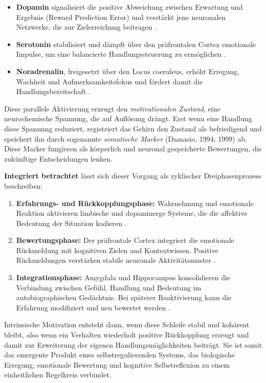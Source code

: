 \begin{itemize}
\item \textbf{Dopamin} signalisiert die positive Abweichung zwischen Erwartung und Ergebnis (Reward Prediction Error) und verstärkt jene neuronalen Netzwerke, die zur Zielerreichung beitragen \cite{Schultz1997}.
\item \textbf{Serotonin} stabilisiert und dämpft über den präfrontalen Cortex emotionale Impulse, um eine balancierte Handlungssteuerung zu ermöglichen \cite{CarverScheier1998, Cools2008}.
\item \textbf{Noradrenalin}, freigesetzt über den Locus coeruleus, erhöht Erregung, Wachheit und Aufmerksamkeitsfokus und fördert damit die Handlungsbereitschaft \cite{AstonJones2005}.
\end{itemize}

Diese parallele Aktivierung erzeugt den \emph{motivationalen Zustand}, eine neurochemische Spannung, die auf Auflösung drängt. Erst wenn eine Handlung diese Spannung reduziert, registriert das Gehirn den Zustand als befriedigend und speichert ihn durch sogenannte \emph{somatische Marker} (Damasio, 1994; 1999) ab. Diese Marker fungieren als körperlich und neuronal gespeicherte Bewertungen, die zukünftige Entscheidungen lenken.

\textbf{Integriert betrachtet} lässt sich dieser Vorgang als zyklischer Dreiphasenprozess beschreiben:

\begin{enumerate}
\item \textbf{Erfahrungs- und Rückkopplungsphase:} Wahrnehmung und emotionale Reaktion aktivieren limbische und dopaminerge Systeme, die die affektive Bedeutung der Situation kodieren \cite{Schultz1997,Rolls2005}.
\item \textbf{Bewertungsphase:} Der präfrontale Cortex integriert die emotionale Rückmeldung mit kognitiven Zielen und Kontextwissen. Positive Rückmeldungen verstärken stabile neuronale Aktivitätsmuster \cite{Damasio1999}.
\item \textbf{Integrationsphase:} Amygdala und Hippocampus konsolidieren die Verbindung zwischen Gefühl, Handlung und Bedeutung im autobiographischen Gedächtnis. Bei späterer Reaktivierung kann die Erfahrung modifiziert und neu bewertet werden \cite{McGaugh2004,Nader2000,LeDoux1996}.
\end{enumerate}

Intrinsische Motivation entsteht dann, wenn diese Schleife stabil und kohärent bleibt, also wenn ein Verhalten wiederholt positive Rückkopplung erzeugt und damit zur Erweiterung der eigenen Handlungsmöglichkeiten beiträgt.
Sie ist somit das emergente Produkt eines selbstregulierenden Systems, das biologische Erregung, emotionale Bewertung und kognitive Selbstreflexion zu einem einheitlichen Regelkreis verbindet.

